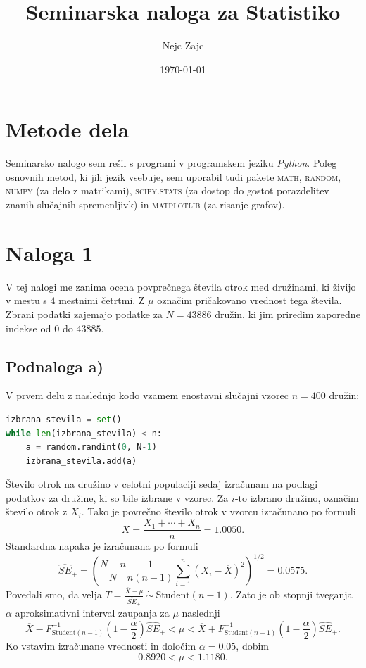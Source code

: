 \documentclass[12pt, a4paper]{article}
\title{Seminarska naloga za Statistiko}
\author{Nejc Zajc}
\date{\today}
\begin{document}
\maketitle

\section*{Metode dela}

Seminarsko nalogo sem rešil s programi v programskem jeziku \textit{Python}. Poleg osnovnih metod, ki jih jezik vsebuje, sem uporabil tudi pakete \textsc{math}, \textsc{random}, \textsc{numpy} (za delo z matrikami), \textsc{scipy.stats} (za dostop do gostot porazdelitev znanih slučajnih spremenljivk) in \textsc{matplotlib} (za risanje grafov).


\section*{Naloga 1}
V tej nalogi me zanima ocena povprečnega števila otrok med družinami, ki živijo v mestu s $4$ mestnimi četrtmi. Z $\mu$ označim pričakovano vrednost tega števila. Zbrani podatki zajemajo podatke za $N = 43886$ družin, ki jim priredim zaporedne indekse od $0$ do $43885$.

\subsection*{Podnaloga a)}
V prvem delu z naslednjo kodo vzamem enostavni slučajni vzorec $n=400$ družin:
\begin{lstlisting}[language=Python]
izbrana_stevila = set()
while len(izbrana_stevila) < n:
    a = random.randint(0, N-1)
    izbrana_stevila.add(a)    
\end{lstlisting}
Število otrok na družino v celotni populaciji sedaj izračunam na podlagi podatkov za družine, ki so bile izbrane v vzorec. Za $i$-to izbrano družino, označim število otrok z $X_i$. Tako je povrečno število otrok v vzorcu izračunano po formuli
\[
\overline{X} = \frac{X_1 + \cdots + X_{n}}{n} = 1.0050.
\]
Standardna napaka je izračunana po formuli
\[
\widehat{SE}_+ = \left( \frac{N-n}{N}\frac{1}{n(n-1)}\sum_{i=1}^n (X_i - \overline{X})^2 \right)^{1/2} = 0.0575.
\]
Povedali smo, da velja $T = \frac{\overline{X} - \mu}{\widehat{SE}_+}\ \dot{\bm{\sim}}\ \text{Student}(n-1)$. Zato je ob stopnji tveganja $\alpha$ aproksimativni interval zaupanja za $\mu$ naslednji
\[
\overline{X} - F^{-1}_{\text{Student}(n-1)}\left(1-\frac{\alpha}{2}\right)\widehat{SE}_+ < \mu <
\overline{X} + F^{-1}_{\text{Student}(n-1)}\left(1-\frac{\alpha}{2}\right)\widehat{SE}_+.
\]
Ko vstavim izračunane vrednosti in določim $\alpha = 0.05$, dobim
\[
0.8920 < \mu < 1.1180.
\]
\end{document}
